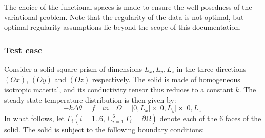 The choice of the functional spaces is made to ensure the well-posedness of the variational problem. 
Note that the regularity of the data is not optimal, but optimal regularity assumptions
lie beyond the scope of this documentation.

\subsubsection{Test case}

Consider a solid square prism of dimensions $L_x,L_y, L_z$ in the three
directions $(Ox)$, $(Oy)$ and $(Oz)$ respectively. The solid is 
made of homogeneous isotropic material, and its conductivity tensor thus
reduces to a constant $k$. 
The  steady state temperature distribution is then given by:
\begin{equation} \label{e:test}
- k \Delta\theta = f \quad in \quad \Omega=
\lbrack 0 , L_x \rbrack \times\lbrack 0 , L_y \rbrack \times\lbrack 0 , L_z \rbrack 
\end{equation}
In what follows, let $\displaystyle \Gamma_i (i=1..6, \cup_{i=1}^6 \Gamma_i = \partial \Omega)$ 
denote each of the 6 faces of the solid.
The solid is subject to the following boundary conditions:
